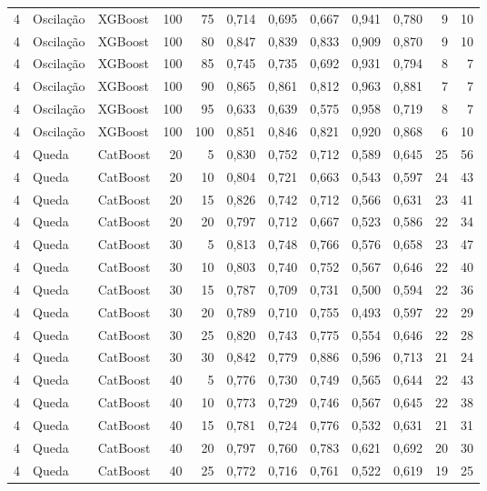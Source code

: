 \begin{longtable}{@{}rllrrrrrrrrr@{}}
4 & Oscilação & XGBoost & 100 & 75 & 0,714 & 0,695 & 0,667 & 0,941 & 0,780 & 9 & 10 \\
4 & Oscilação & XGBoost & 100 & 80 & 0,847 & 0,839 & 0,833 & 0,909 & 0,870 & 9 & 10 \\
4 & Oscilação & XGBoost & 100 & 85 & 0,745 & 0,735 & 0,692 & 0,931 & 0,794 & 8 & 7 \\
4 & Oscilação & XGBoost & 100 & 90 & 0,865 & 0,861 & 0,812 & 0,963 & 0,881 & 7 & 7 \\
4 & Oscilação & XGBoost & 100 & 95 & 0,633 & 0,639 & 0,575 & 0,958 & 0,719 & 8 & 7 \\
4 & Oscilação & XGBoost & 100 & 100 & 0,851 & 0,846 & 0,821 & 0,920 & 0,868 & 6 & 10 \\
4 & Queda & CatBoost & 20 & 5 & 0,830 & 0,752 & 0,712 & 0,589 & 0,645 & 25 & 56 \\
4 & Queda & CatBoost & 20 & 10 & 0,804 & 0,721 & 0,663 & 0,543 & 0,597 & 24 & 43 \\
4 & Queda & CatBoost & 20 & 15 & 0,826 & 0,742 & 0,712 & 0,566 & 0,631 & 23 & 41 \\
4 & Queda & CatBoost & 20 & 20 & 0,797 & 0,712 & 0,667 & 0,523 & 0,586 & 22 & 34 \\
4 & Queda & CatBoost & 30 & 5 & 0,813 & 0,748 & 0,766 & 0,576 & 0,658 & 23 & 47 \\
4 & Queda & CatBoost & 30 & 10 & 0,803 & 0,740 & 0,752 & 0,567 & 0,646 & 22 & 40 \\
4 & Queda & CatBoost & 30 & 15 & 0,787 & 0,709 & 0,731 & 0,500 & 0,594 & 22 & 36 \\
4 & Queda & CatBoost & 30 & 20 & 0,789 & 0,710 & 0,755 & 0,493 & 0,597 & 22 & 29 \\
4 & Queda & CatBoost & 30 & 25 & 0,820 & 0,743 & 0,775 & 0,554 & 0,646 & 22 & 28 \\
4 & Queda & CatBoost & 30 & 30 & 0,842 & 0,779 & 0,886 & 0,596 & 0,713 & 21 & 24 \\
4 & Queda & CatBoost & 40 & 5 & 0,776 & 0,730 & 0,749 & 0,565 & 0,644 & 22 & 43 \\
4 & Queda & CatBoost & 40 & 10 & 0,773 & 0,729 & 0,746 & 0,567 & 0,645 & 22 & 38 \\
4 & Queda & CatBoost & 40 & 15 & 0,781 & 0,724 & 0,776 & 0,532 & 0,631 & 21 & 31 \\
4 & Queda & CatBoost & 40 & 20 & 0,797 & 0,760 & 0,783 & 0,621 & 0,692 & 20 & 30 \\
4 & Queda & CatBoost & 40 & 25 & 0,772 & 0,716 & 0,761 & 0,522 & 0,619 & 19 & 25 \\

\end{longtable}
